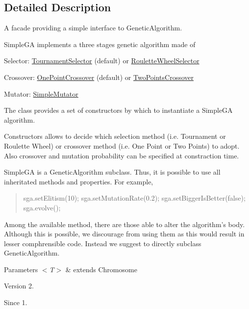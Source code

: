 \subsection{Detailed Description}
A facade providing a simple interface to Genetic\-Algorithm. 

{\ttfamily Simple\-G\-A} implements a three stages genetic algorithm made of 
\begin{DoxyItemize}
\item Selector\-: \hyperlink{}{Tournament\-Selector} (default) or \hyperlink{}{Roulette\-Wheel\-Selector} 
\item Crossover\-: \hyperlink{}{One\-Point\-Crossover} (default) or \hyperlink{}{Two\-Points\-Crossover} 
\item Mutator\-: \hyperlink{}{Simple\-Mutator} 
\end{DoxyItemize}The class provides a set of constructors by which to instantiate a {\ttfamily Simple\-G\-A} algorithm. 

Constructors allows to decide which selection method (i.\-e. Tournament or Roulette Wheel) or crossover method (i.\-e. One Point or Two Points) to adopt. Also crossover and mutation probability can be specified at constraction time. 

{\ttfamily Simple\-G\-A} is a {\ttfamily Genetic\-Algorithm} subclass. Thus, it is possible to use all inheritated methods and properties. For example, 

\begin{quotation}

\begin{DoxyPre}
 sga.setElitism(10);
 sga.setMutationRate(0.2);
 sga.setBiggerIsBetter(false);
 sga.evolve();
\end{DoxyPre}
\end{quotation}


Among the available method, there are those able to alter the algorithm's body. Although this is possible, we discourage from using them as this would result in lesser comphrensible code. Instead we suggest to directly subclass {\ttfamily Genetic\-Algorithm}. 


\begin{DoxyParams}{Parameters}
{\em $<$\-T$>$} & extends Chromosome\\
\hline
\end{DoxyParams}
\begin{DoxyVersion}{Version}
2. 
\end{DoxyVersion}
\begin{DoxySince}{Since}
1. 
\end{DoxySince}


